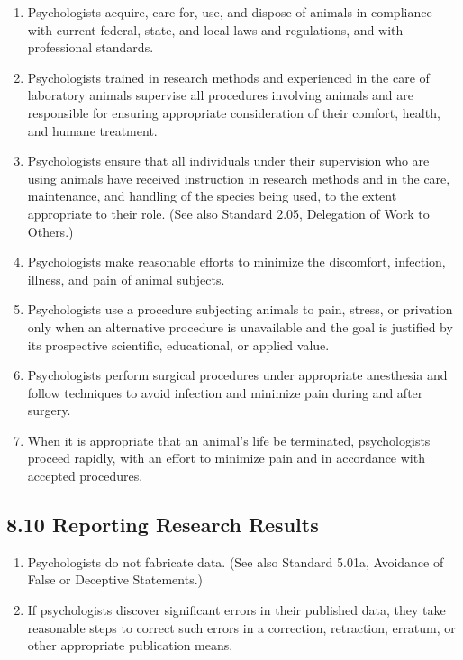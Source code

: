 \begin{enumerate}

\item Psychologists acquire, care for, use, and dispose of animals in compliance with current federal, state, and local laws and regulations, and with professional standards.


\item Psychologists trained in research methods and experienced in the care of laboratory animals supervise all procedures involving animals and are responsible for ensuring appropriate consideration of their comfort, health, and humane treatment.


\item Psychologists ensure that all individuals under their supervision who are using animals have received instruction in research methods and in the care, maintenance, and handling of the species being used, to the extent appropriate to their role. (See also Standard 2.05, Delegation of Work to Others.)


\item Psychologists make reasonable efforts to minimize the discomfort, infection, illness, and pain of animal subjects.


\item Psychologists use a procedure subjecting animals to pain, stress, or privation only when an alternative procedure is unavailable and the goal is justified by its prospective scientific, educational, or applied value.


\item  Psychologists perform surgical procedures under appropriate anesthesia and follow techniques to avoid infection and minimize pain during and after surgery.


\item  When it is appropriate that an animal's life be terminated, psychologists proceed rapidly, with an effort to minimize pain and in accordance with accepted procedures.

\end{enumerate}


\subsection{8.10 Reporting Research Results}

\begin{enumerate}
\item
Psychologists do not fabricate data. (See also Standard 5.01a, Avoidance of False or Deceptive Statements.)


\item If psychologists discover significant errors in their published data, they take reasonable steps to correct such errors in a correction, retraction, erratum, or other appropriate publication means.
\end{enumerate}


